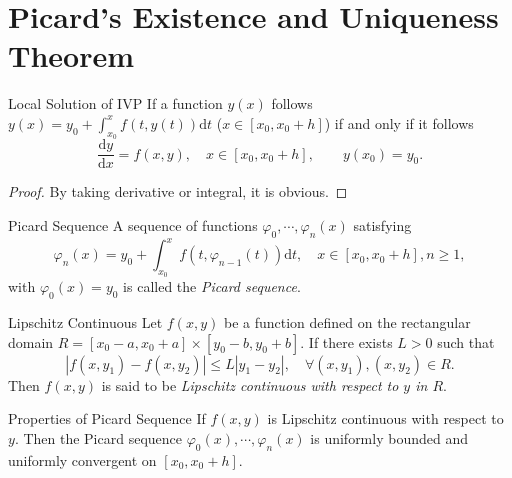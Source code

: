 
\section{Picard's Existence and Uniqueness Theorem}


\begin{lemma}{Local Solution of IVP}{}
  If a function $y(x)$ follows
  $y(x) = y_0 + \int_{x_0}^xf(t,y(t))\mathrm{d} t$ ($x \in [x_0, x_0 + h]$)
  if and only if it follows
  \begin{equation}
    \frac{\mathrm{d} y}{\mathrm{d} x} = f(x,y), \quad x \in [x_0, x_0 + h],
    \quad \quad y(x_0) = y_0.
  \end{equation}
\end{lemma}

\begin{proof}
  By taking derivative or integral, it is obvious.
\end{proof}

\begin{definition}{Picard Sequence}{}
  A sequence of functions $\varphi_0,\cdots,\varphi_n(x)$ satisfying
  \begin{equation}
    \varphi_n(x) = y_0 + \int_{x_0}^x f(t, \varphi_{n-1}(t))\mathrm{d} t, \quad
    x \in [x_0, x_0 + h], n \geq 1,
  \end{equation}
  with $\varphi_0(x) = y_0$ is called the \emph{Picard sequence}.
\end{definition}

\begin{definition}{Lipschitz Continuous}{}
  Let $f(x,y)$ be a function defined on
  the rectangular domain $R = [x_0-a,x_0+a] \times [y_0-b, y_0 + b]$.
  If there exists $L > 0$ such that
  \begin{equation}
    \left| f(x,y_1) - f(x,y_2)  \right| \leq L |y_1 - y_2|, \quad
    \forall (x, y_1), (x, y_2) \in R.
  \end{equation}
  Then $f(x,y)$ is said to be \emph{Lipschitz continuous with respect to $y$ in $R$}.
\end{definition}

\begin{lemma}{Properties of Picard Sequence}{}
  If $f(x,y)$ is Lipschitz continuous with respect to $y$.
  Then the Picard sequence $\varphi_0(x),\cdots,\varphi_n(x)$ is
  uniformly bounded and uniformly convergent on $[x_0, x_0 + h]$.
\end{lemma}


